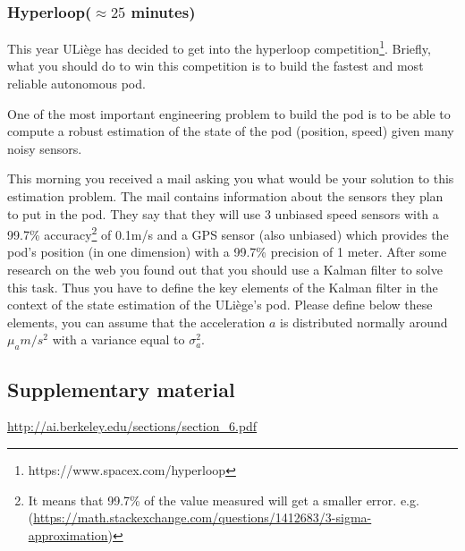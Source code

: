 \documentclass[a4paper, 10pt]{article}
\begin{document}
   \subsubsection{Hyperloop($\approx 25$ minutes)}
   This year ULiège has decided to get into the hyperloop competition\footnote{https://www.spacex.com/hyperloop}. Briefly, what you should do to win this competition is to build the fastest and most reliable autonomous pod. 
   
   One of the most important engineering problem to build the pod is to be able to compute a robust estimation of the state of the pod (position, speed) given many noisy sensors. 
   
   This morning you received a mail asking you what would be your solution to this estimation problem. The mail contains information about the sensors they plan to put in the pod. They say that they will use 3 unbiased speed sensors with a 99.7\% accuracy\footnote{It means that 99.7\% of the value measured will get a smaller error. e.g. (\url{https://math.stackexchange.com/questions/1412683/3-sigma-approximation})} of 0.1m/s and a GPS sensor (also unbiased) which provides the pod's position (in one dimension) with a 99.7\% precision of 1 meter. After some research on the web you found out that you should use a Kalman filter to solve this task. Thus you have to define the key elements of the Kalman filter in the context of the state estimation of the ULiège's pod. Please define below these elements, you can assume that the acceleration $a$ is distributed normally around $\mu_a m/s^2$ with a variance equal to $\sigma_a^2$.
   \subsection{Supplementary material}
   \url{http://ai.berkeley.edu/sections/section_6.pdf}
\end{document}
